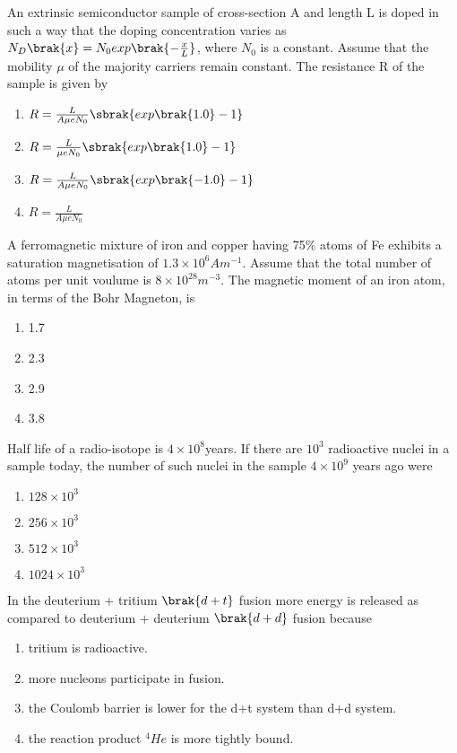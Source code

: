 	\item An extrinsic semiconductor sample of cross-section A and length L is doped in such a way that the doping concentration varies as $N_D\brak{x} = N_0exp\brak{-\frac{x}{L}}$, where $N_0$ is a constant. Assume that the mobility $\mu$ of the majority carriers remain constant. The resistance R of the sample is given by
		\begin{enumerate}
			\item $R = \frac{L}{A\mu eN_0}\sbrak{exp\brak{1.0} - 1}$
			\item $R = \frac{L}{\mu eN_0}\sbrak{exp\brak{1.0} - 1}$
			\item $R = \frac{L}{A\mu eN_0}\sbrak{exp\brak{-1.0} - 1}$
			\item $R= \frac{L}{A\mu eN_0}$
		\end{enumerate}
	\item A ferromagnetic mixture of iron and copper having 75\% atoms of Fe exhibits a saturation magnetisation of $1.3\times10^6 A m^{-1}$. Assume that the total number of atoms per unit voulume is $8\times10^{28} m^{-3}$. The magnetic moment of an iron atom, in terms of the Bohr Magneton, is
		\begin{enumerate}
			\item 1.7
			\item 2.3
			\item 2.9
			\item 3.8
		\end{enumerate}
	\item Half life of a radio-isotope is $4\times10^8$years. If there are $10^3$ radioactive nuclei in a sample today, the number of such nuclei in the sample $4\times10^9$ years ago were
		\begin{enumerate}
			\item $128\times10^3$
			\item $256\times10^3$
			\item $512\times10^3$
			\item $1024\times10^3$
		\end{enumerate}
	\item In the deuterium + tritium $\brak{d+t}$ fusion more energy is released as compared to deuterium + deuterium $\brak{d+d}$ fusion because
		\begin{enumerate}
			\item tritium is radioactive.
			\item more nucleons participate in fusion.
			\item the Coulomb barrier is lower for the d+t system than d+d system.
			\item the reaction product $^4He$ is more tightly bound.
		\end{enumerate}
